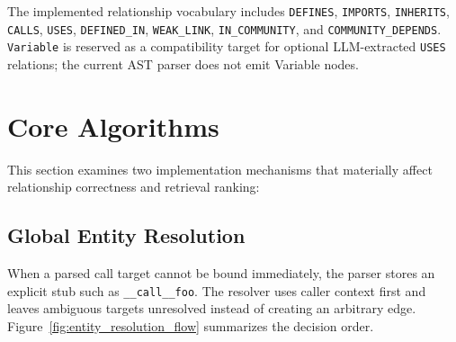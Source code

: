 \documentclass[12pt,letterpaper,oneside]{report}
\begin{document}
The implemented relationship vocabulary includes \texttt{DEFINES}, \texttt{IMPORTS}, \texttt{INHERITS}, \texttt{CALLS}, \texttt{USES}, \texttt{DEFINED\_IN}, \texttt{WEAK\_LINK}, \texttt{IN\_COMMUNITY}, and \texttt{COMMUNITY\_DEPENDS}. \texttt{Variable} is reserved as a compatibility target for optional LLM-extracted \texttt{USES} relations; the current AST parser does not emit Variable nodes.

\section{Core Algorithms}
This section examines two implementation mechanisms that materially affect relationship correctness and retrieval ranking:

\subsection{Global Entity Resolution}
\label{sec:entity_resolution}
When a parsed call target cannot be bound immediately, the parser stores an explicit stub such as \texttt{\_\_call\_\_foo}. The resolver uses caller context first and leaves ambiguous targets unresolved instead of creating an arbitrary edge. Figure~\ref{fig:entity_resolution_flow} summarizes the decision order.
\end{document}
